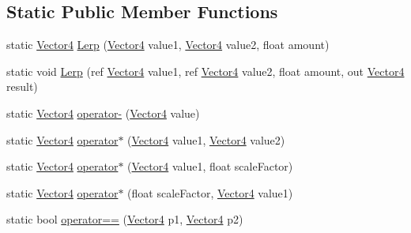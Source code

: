 \subsection*{Static Public Member Functions}
\begin{DoxyCompactItemize}
\item 
static \hyperlink{struct_microsoft_1_1_xna_1_1_framework_1_1_vector4}{Vector4} \hyperlink{struct_microsoft_1_1_xna_1_1_framework_1_1_vector4_a8b48522c38d51c1ca4592a887ce3ed44}{Lerp} (\hyperlink{struct_microsoft_1_1_xna_1_1_framework_1_1_vector4}{Vector4} value1, \hyperlink{struct_microsoft_1_1_xna_1_1_framework_1_1_vector4}{Vector4} value2, float amount)
\item 
static void \hyperlink{struct_microsoft_1_1_xna_1_1_framework_1_1_vector4_a271ae729c5984fb9f83c599fa6fa9441}{Lerp} (ref \hyperlink{struct_microsoft_1_1_xna_1_1_framework_1_1_vector4}{Vector4} value1, ref \hyperlink{struct_microsoft_1_1_xna_1_1_framework_1_1_vector4}{Vector4} value2, float amount, out \hyperlink{struct_microsoft_1_1_xna_1_1_framework_1_1_vector4}{Vector4} result)
\item 
static \hyperlink{struct_microsoft_1_1_xna_1_1_framework_1_1_vector4}{Vector4} \hyperlink{struct_microsoft_1_1_xna_1_1_framework_1_1_vector4_a29699bf03cbd83a16f768357487a3fd4}{operator-\/} (\hyperlink{struct_microsoft_1_1_xna_1_1_framework_1_1_vector4}{Vector4} value)
\item 
static \hyperlink{struct_microsoft_1_1_xna_1_1_framework_1_1_vector4}{Vector4} \hyperlink{struct_microsoft_1_1_xna_1_1_framework_1_1_vector4_affa284b6ae1f3b63cb9e52bb242ae384}{operator$\ast$} (\hyperlink{struct_microsoft_1_1_xna_1_1_framework_1_1_vector4}{Vector4} value1, \hyperlink{struct_microsoft_1_1_xna_1_1_framework_1_1_vector4}{Vector4} value2)
\item 
static \hyperlink{struct_microsoft_1_1_xna_1_1_framework_1_1_vector4}{Vector4} \hyperlink{struct_microsoft_1_1_xna_1_1_framework_1_1_vector4_aa4bfe093a7ee353158230a2aa4d06c10}{operator$\ast$} (\hyperlink{struct_microsoft_1_1_xna_1_1_framework_1_1_vector4}{Vector4} value1, float scale\+Factor)
\item 
static \hyperlink{struct_microsoft_1_1_xna_1_1_framework_1_1_vector4}{Vector4} \hyperlink{struct_microsoft_1_1_xna_1_1_framework_1_1_vector4_a4ca9a6399d64d57a7470f0c061eadbf3}{operator$\ast$} (float scale\+Factor, \hyperlink{struct_microsoft_1_1_xna_1_1_framework_1_1_vector4}{Vector4} value1)
\item 
static bool \hyperlink{struct_microsoft_1_1_xna_1_1_framework_1_1_vector4_aa84a15719c7f8f0e33d408c44160d066}{operator==} (\hyperlink{struct_microsoft_1_1_xna_1_1_framework_1_1_vector4}{Vector4} p1, \hyperlink{struct_microsoft_1_1_xna_1_1_framework_1_1_vector4}{Vector4} p2)

\end{DoxyCompactItemize}
